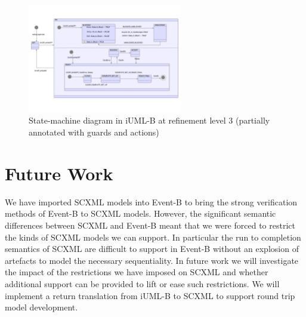 \documentclass{easychair}
\begin{document}
\begin{figure}[]
  \begin{centering}
  \includegraphics[width=0.6\textwidth]{caseStudy/TurnstileSimpleModel_iumlb}
  \caption{State-machine diagram in iUML-B at refinement level 3 (partially annotated with guards and actions)}
  \label{fig:StatemachineiUML-B}
  \end{centering}
\end{figure} 


\section{Future Work}
\label{sect:future-work}
We have imported SCXML models into Event-B to bring the 
strong verification methods of Event-B to SCXML models. 
However, the significant semantic differences between SCXML 
and Event-B meant that we were forced to restrict the kinds 
of SCXML models we can support.
In particular the run to completion semantics of SCXML are 
difficult to support in Event-B without an explosion of 
artefacts to model the necessary sequentiality. 
In future work we will investigate the impact of the 
restrictions we have imposed on SCXML and whether 
additional support can be provided to lift or ease
such restrictions.
We will implement a return translation from iUML-B to SCXML 
to support round trip model development. 








\end{document}
